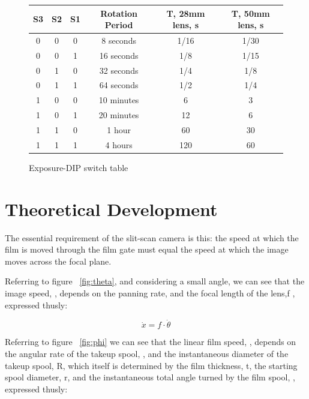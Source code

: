 \documentclass[dvips,12pt]{article}
\begin{document}
\renewcommand{\arraystretch}{1.4}%
\begin{figure}[htb]
\centering
\begin{tabular}{|c|c|c|c|c|c|}
\hline
S3&S2&S1&Rotation Period&T, 28mm lens, s&T, 50mm lens, s\\
\hline
0&0&0&8 seconds&1/16&1/30\\
\hline
0&0&1&16 seconds&1/8&1/15\\
\hline
0&1&0&32 seconds&1/4&1/8\\
\hline
0&1&1&64 seconds&1/2&1/4\\
\hline
1&0&0&10 minutes&6&3\\
\hline
1&0&1&20 minutes&12&6\\
\hline
1&1&0&1 hour&60&30\\
\hline
1&1&1&4 hours&120&60\\
\hline
\end{tabular}
\caption{Exposure-DIP switch table}
\label{fig:exposure}
\end{figure}
%

\section{Theoretical Development}


The essential requirement of the slit-scan camera is this: the speed at which the film is moved through the film gate must equal the speed at which the image moves across the focal plane.

Referring to figure ~\ref{fig:theta}, and considering a small angle, we can see that the image speed, \math {} \), depends on the panning rate, \math \dot{\theta} \) and the focal length of the lens,\math f \), expressed thusly:

\begin{displaymath}
\dot{x} = f \cdot \dot{\theta }
\end{displaymath}

Referring to figure ~\ref{fig:phi} we can see that the linear film speed, \math {}\) , depends on the angular rate of the takeup spool, \math \dot{\phi}\), and the instantaneous diameter of the takeup spool, \math R\), which itself is determined by the film thickness, \math t\), the starting spool diameter, \math r\), and the instantaneous total angle turned by the film spool, \math \phi \), expressed thusly:
\end{document}
